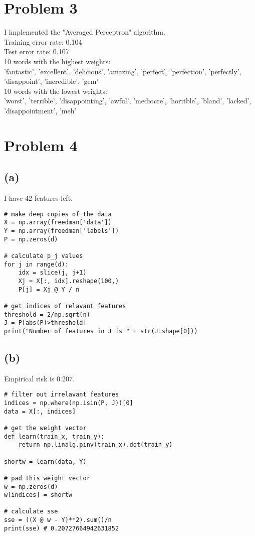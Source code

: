 \documentclass[11pt]{article}
\begin{document}
\section*{Problem 3}
I implemented the "Averaged Perceptron" algorithm. \\

Training error rate: 0.104 \\
Test error rate: 0.107 \\

10 words with the highest weights: \\
'fantastic', 'excellent', 'delicious', 'amazing', 'perfect', 'perfection', 'perfectly', 'disappoint', 'incredible', 'gem'\\

10 words with the lowest weights:\\
'worst', 'terrible', 'disappointing', 'awful', 'mediocre', 'horrible', 'bland', 'lacked', 'disappointment', 'meh'

\newpage
\section*{Problem 4}
\subsection*{(a)}
I have 42 features left.

\begin{verbatim}
# make deep copies of the data
X = np.array(freedman['data'])
Y = np.array(freedman['labels'])
P = np.zeros(d)

# calculate p_j values
for j in range(d):
    idx = slice(j, j+1)
    Xj = X[:, idx].reshape(100,)
    P[j] = Xj @ Y / n

# get indices of relavant features
threshold = 2/np.sqrt(n)
J = P[abs(P)>threshold]
print("Number of features in J is " + str(J.shape[0]))
\end{verbatim}

\subsection*{(b)}
Empirical risk is 0.207.
\begin{verbatim}
# filter out irrelavant features
indices = np.where(np.isin(P, J))[0]
data = X[:, indices]

# get the weight vector
def learn(train_x, train_y):
    return np.linalg.pinv(train_x).dot(train_y)

shortw = learn(data, Y)

# pad this weight vector
w = np.zeros(d)
w[indices] = shortw

# calculate sse
sse = ((X @ w - Y)**2).sum()/n
print(sse) # 0.20727664942631852
\end{verbatim}
\end{document}
